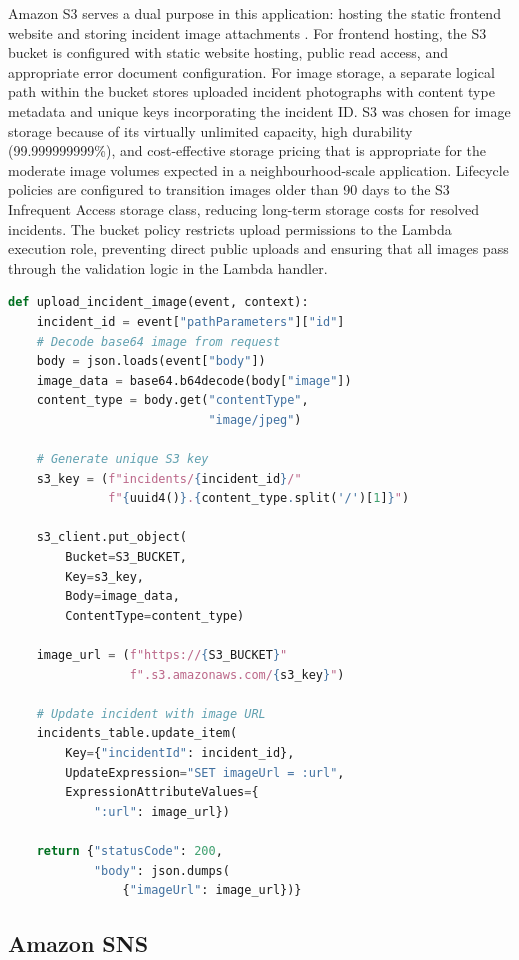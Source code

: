 \documentclass[conference]{IEEEtran}
\begin{document}
Amazon S3 serves a dual purpose in this application: hosting the static frontend website and storing incident image attachments \cite{awss3}. For frontend hosting, the S3 bucket is configured with static website hosting, public read access, and appropriate error document configuration. For image storage, a separate logical path within the bucket stores uploaded incident photographs with content type metadata and unique keys incorporating the incident ID. S3 was chosen for image storage because of its virtually unlimited capacity, high durability (99.999999999\%), and cost-effective storage pricing that is appropriate for the moderate image volumes expected in a neighbourhood-scale application. Lifecycle policies are configured to transition images older than 90 days to the S3 Infrequent Access storage class, reducing long-term storage costs for resolved incidents. The bucket policy restricts upload permissions to the Lambda execution role, preventing direct public uploads and ensuring that all images pass through the validation logic in the Lambda handler.

\begin{lstlisting}[language=Python, caption={S3 image upload for incident evidence}]
def upload_incident_image(event, context):
    incident_id = event["pathParameters"]["id"]
    # Decode base64 image from request
    body = json.loads(event["body"])
    image_data = base64.b64decode(body["image"])
    content_type = body.get("contentType",
                            "image/jpeg")

    # Generate unique S3 key
    s3_key = (f"incidents/{incident_id}/"
              f"{uuid4()}.{content_type.split('/')[1]}")

    s3_client.put_object(
        Bucket=S3_BUCKET,
        Key=s3_key,
        Body=image_data,
        ContentType=content_type)

    image_url = (f"https://{S3_BUCKET}"
                 f".s3.amazonaws.com/{s3_key}")

    # Update incident with image URL
    incidents_table.update_item(
        Key={"incidentId": incident_id},
        UpdateExpression="SET imageUrl = :url",
        ExpressionAttributeValues={
            ":url": image_url})

    return {"statusCode": 200,
            "body": json.dumps(
                {"imageUrl": image_url})}
\end{lstlisting}

\subsection{Amazon SNS}
\end{document}
